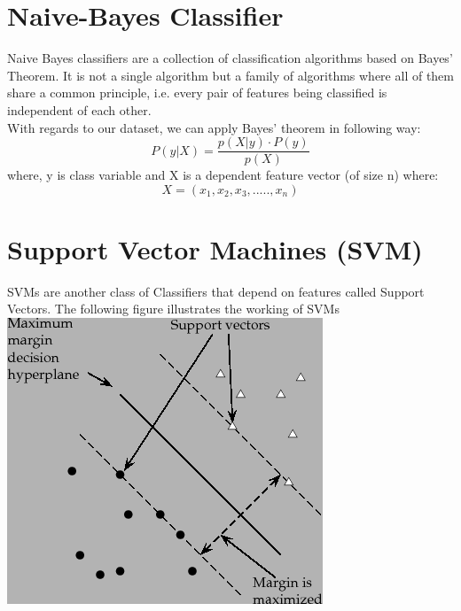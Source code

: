 \documentclass[11pt]{article}
\begin{document}
\clearpage

\section{Naive-Bayes Classifier}

Naive Bayes classifiers are a collection of classification algorithms based on Bayes’ Theorem. It is not a single algorithm but a family of algorithms where all of them share a common principle, i.e. every pair of features being classified is independent of each other.\\
With regards to our dataset, we can apply Bayes’ theorem in following way:\\
$$ P(y | X) = \frac{p(X | y) \cdot P(y)}{p(X)} $$
where, y is class variable and X is a dependent feature vector (of size n) where:
$$ X = (x_{1}, x_{2}, x_{3},....., x_{n}) $$

\clearpage

\section{Support Vector Machines (SVM)}

SVMs are another class of Classifiers that depend on features called Support Vectors. The following figure illustrates the working of SVMs\\

\noindent \includegraphics[width=\textwidth]{svm.png}
\end{document}
